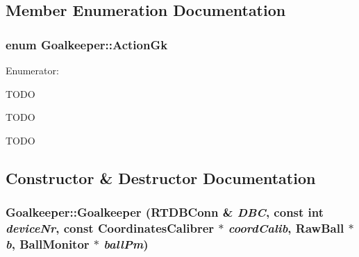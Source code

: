 \subsection{Member Enumeration Documentation}
\hypertarget{classGoalkeeper_a25db0bed632b4bdb87532b0fbbf45855}{
\subsubsection[{ActionGk}]{\setlength{\rightskip}{0pt plus 5cm}enum {\bf Goalkeeper::ActionGk}}}
\label{classGoalkeeper_a25db0bed632b4bdb87532b0fbbf45855}
\begin{Desc}
\item[Enumerator: ]\par
\begin{description}
\item[{\em 
\hypertarget{classGoalkeeper_a25db0bed632b4bdb87532b0fbbf45855af1fa8ff07676a5e27f9cc78f6811c704}{
GO\_\-TO\_\-DEF\_\-POS}
\label{classGoalkeeper_a25db0bed632b4bdb87532b0fbbf45855af1fa8ff07676a5e27f9cc78f6811c704}
}]TODO \item[{\em 
\hypertarget{classGoalkeeper_a25db0bed632b4bdb87532b0fbbf45855a96b7bc8aa3f3a4d1b68955f8d757e9c1}{
PREVENT\_\-GOAL}
\label{classGoalkeeper_a25db0bed632b4bdb87532b0fbbf45855a96b7bc8aa3f3a4d1b68955f8d757e9c1}
}]TODO \item[{\em 
\hypertarget{classGoalkeeper_a25db0bed632b4bdb87532b0fbbf45855a7940a4d0074c5f5bb33743797387c2c1}{
STOP}
\label{classGoalkeeper_a25db0bed632b4bdb87532b0fbbf45855a7940a4d0074c5f5bb33743797387c2c1}
}]TODO \end{description}
\end{Desc}



\subsection{Constructor \& Destructor Documentation}
\hypertarget{classGoalkeeper_a7ad214162340c37a695ba00d4576c3c4}{
\subsubsection[{Goalkeeper}]{\setlength{\rightskip}{0pt plus 5cm}Goalkeeper::Goalkeeper (RTDBConn \& {\em DBC}, \/  const int {\em deviceNr}, \/  const {\bf CoordinatesCalibrer} $\ast$ {\em coordCalib}, \/  RawBall $\ast$ {\em b}, \/  {\bf BallMonitor} $\ast$ {\em ballPm})}}
\label{classGoalkeeper_a7ad214162340c37a695ba00d4576c3c4}

